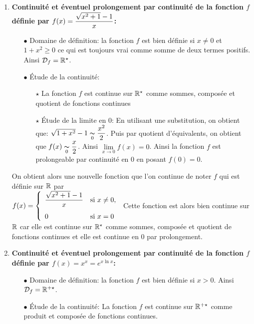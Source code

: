 \documentclass[a4paper, 11pt,reqno]{article}
\begin{document}
\begin{correction}
\begin{enumerate}
		\item \textbf{Continuit\'e et \'eventuel prolongement par continuit\'e de la fonction $f$ d\'efinie par $f(x)=\displaystyle\frac{\sqrt{x^2+1}-1}{x}$:}
		      \begin{itemize}
			      \item[$\bullet$] Domaine de d\'efinition: la fonction $f$ est bien d\'efinie si $x\not= 0$ et $1+x^2\geq 0$ ce qui est toujours vrai comme somme de deux termes positifs. Ainsi $\mathcal{D}_{f}=\mathbb{R}^{\star}$.
			      \item[$\bullet$] \'Etude de la continuit\'e:
			            \begin{itemize}
				            \item[$\star$] La fonction $f$ est continue sur $\mathbb{R}^{\star}$ comme sommes, compos\'ee et quotient de fonctions continues
				            \item[$\star$] \'Etude de la limite en $0$: En utilisant une substitution, on obtient que: $\sqrt{1+x^2}-1\underset{0}{\thicksim} \displaystyle\frac{x^2}{2}$. Puis par quotient d'\'equivalents, on obtient que $f(x)\underset{0}{\thicksim} \displaystyle\frac{x}{2}$. Ainsi $\lim\limits_{x\to 0} f(x)=0$. Ainsi la fonction $f$ est prolongeable par continuit\'e en $0$ en posant $f(0)=0$.
			            \end{itemize}
		      \end{itemize}
		      On obtient alors une nouvelle fonction que l'on continue de noter $f$ qui est d\'efinie sur $\mathbb{R}$ par\\
		      \noindent  $f(x)=\left\lbrace \begin{array}{ll} \ddp\frac{\sqrt{x^2+1}-1}{x}& \hbox{si}\ x\not= 0,\vsec\\ 0& \hbox{si}\ x=0 \end{array}\right.$ Cette fonction est alors bien continue sur $\mathbb{R}$ car elle est continue sur $\mathbb{R}^{\star}$ comme sommes, compos\'ee et quotient de fonctions continues et elle est continue en $0$ par prolongement.
		\item  \textbf{Continuit\'e et \'eventuel prolongement par continuit\'e de la fonction $f$ d\'efinie par $f(x)=x^x=e^{x\ln{x}}$:}
		      \begin{itemize}
			      \item[$\bullet$] Domaine de d\'efinition: la fonction $f$ est bien d\'efinie si $x>0$. Ainsi $\mathcal{D}_{f}=\mathbb{R}^{+\star}$.
			      \item[$\bullet$] \'Etude de la continuit\'e: La fonction $f$ est continue sur $\mathbb{R}^{+\star}$ comme produit et compos\'ee de fonctions continues.

\end{itemize}
\end{enumerate}
\end{correction}
\end{document}

